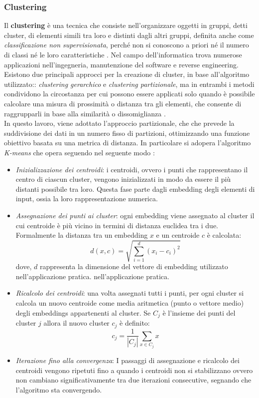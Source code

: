 \documentclass{article}
\begin{document}
\subsubsection{Clustering}
Il \textbf{clustering} è una tecnica che consiste nell'organizzare oggetti in gruppi, detti cluster, di elementi simili tra loro e distinti dagli altri gruppi, definita anche come \textit{classificazione non supervisionata}, perché non si conoscono a priori né il numero di classi né le loro caratteristiche \cite{basciani2016automated}.
Nel campo dell'informatica trova numerose applicazioni nell'ingegneria, manutenzione del software e reverse engineering\cite{basciani2016automated}.\\
Esistono due principali approcci per la creazione di cluster, in base all'algoritmo utilizzato:: \textit{clustering gerarchico} e \textit{clustering partizionale}, ma in entrambi i metodi condividono la circostanza per cui possono essere applicati solo quando è possibile calcolare una misura di prossimità o distanza tra gli elementi, che consente di raggrupparli in base alla similarità o dissomiglianza \cite{basciani2016automated}.\\
In questo lavoro, viene adottato l'approccio partizionale, che che prevede la suddivisione dei dati in un numero fisso di partizioni, ottimizzando una funzione obiettivo basata su una metrica di distanza. In particolare si adopera l'algoritmo \textit{K-means} che opera seguendo nel seguente modo \cite{scikit-learn}:
\begin{itemize}
    \item \textit{Inizializzazione dei centroidi}: i centroidi, ovvero i punti che rappresentano il centro di ciascun cluster, vengono inizializzati in modo da essere il più distanti possibile tra loro. Questa fase parte dagli embedding degli elementi di input, ossia la loro rappresentazione numerica.
    \item \textit{Assegnazione dei punti ai cluster}: ogni embedding viene assegnato al cluster il cui centroide è più vicino in termini di distanza euclidea tra i due. Formalmente la distanza tra un embedding $x$ e un centroide $c$ è calcolata:
    \begin{equation}
        d(x, c) = \sqrt{\sum_{i=1}^{d} (x_i - c_i)^2}
    \end{equation}
    dove, $d$ rappresenta la dimensione del vettore di embedding utilizzato nell'applicazione pratica. nell'applicazione pratica. 
    \item \textit{Ricalcolo dei centroidi}: una volta assegnati tutti i punti, per ogni cluster si calcola un nuovo centroide come media aritmetica (punto o vettore medio) degli embeddings appartenenti al cluster. Se $C_{j}$ è l'insieme dei punti del cluster $j$ allora il nuovo cluster $c_{j}$ è definito:
    \begin{equation}
        c_j = \frac{1}{|C_j|} \sum_{x \in C_j} x
    \end{equation}
    \item \textit{Iterazione fino alla convergenza}: I passaggi di assegnazione e ricalcolo dei centroidi vengono ripetuti fino a quando i centroidi non si stabilizzano ovvero non cambiano significativamente tra due iterazioni consecutive, segnando che l'algoritmo sta convergendo.
\end{itemize}
\end{document}
